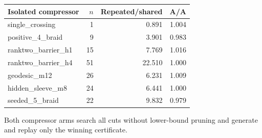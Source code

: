 \begin{center}
\begin{tabular}{@{}lrrr@{}}
\toprule
Isolated compressor & $n$ & Repeated/shared & A/A \\
\midrule
single\_crossing & 1 & 0.891 & 1.004 \\
positive\_4\_braid & 9 & 3.901 & 0.983 \\
ranktwo\_barrier\_h1 & 15 & 7.769 & 1.016 \\
ranktwo\_barrier\_h4 & 51 & 22.510 & 1.000 \\
geodesic\_m12 & 26 & 6.231 & 1.009 \\
hidden\_sleeve\_m8 & 24 & 6.441 & 1.000 \\
seeded\_5\_braid & 22 & 9.832 & 0.979 \\
\bottomrule
\end{tabular}
\end{center}
Both compressor arms search all cuts without lower-bound pruning and generate and replay only the winning certificate.

